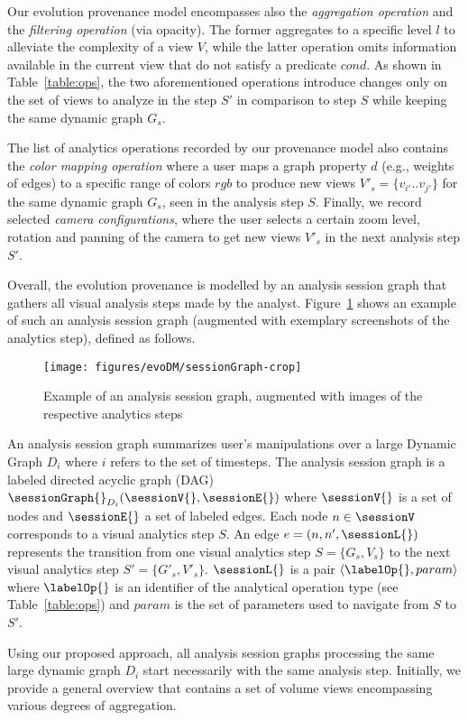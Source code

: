Our evolution provenance model encompasses also the \emph{aggregation operation} and the \emph{filtering operation} (via opacity). 
The former aggregates to a specific level $l$ to alleviate the complexity of a view $V$, while the latter operation omits information available in the current view that do not satisfy a predicate $cond$. As shown in Table~\ref{table:ops}, the two aforementioned operations introduce changes only on the set of views to analyze in the step $S'$ in comparison to step $S$ while keeping the same dynamic graph $G_s$.

The list of analytics operations recorded by our provenance model also contains the \emph{color mapping operation} where a user maps a graph property $d$ (e.g., weights of edges) to a specific range of colors $rgb$ to produce new views $V'_{s}=\{v_{i'}..v_{j'}\}$ for the same dynamic graph $G_s$, seen in the analysis step $S$. 
Finally, we record selected \emph{camera configurations}, where the user selects a certain zoom level, rotation and panning of the camera to get new views $V'_s$ in the next analysis step $S'$.




Overall, the evolution provenance is modelled by an analysis session graph that gathers all visual analysis steps made by the analyst. 
Figure~\ref{fig:expo-session} shows an example of such an analysis session graph (augmented with exemplary screenshots of the analytics step), defined as follows.

\begin{figure}[t]
	\begin{center}
	\texttt{[image: figures/evoDM/sessionGraph-crop]}
			\end{center}
			\caption{Example of an analysis session graph, augmented with images of the respective analytics steps~\cite{Bruder2019}}
			\label{fig:expo-session}
\end{figure}

\begin{definition}
An analysis session graph summarizes user's manipulations over a large Dynamic Graph $D_i$ where $i$ refers to the set of timesteps.
The analysis session graph is a labeled directed acyclic graph (DAG) $\sessionGraph{}_{D_i}(\sessionV{}, \sessionE{})$ where $\sessionV{}$ is a set of nodes and $\sessionE{}$ a set of labeled edges. 
Each node $n \in \sessionV$ corresponds to a visual analytics step $S$.
An edge $e = (n, n', \sessionL{})$ represents the transition from one visual analytics step $S = \{{G_s}, V_s\}$ to the next visual analytics step $S' = \{{G'_s}, V'_s\}$. $\sessionL{}$ is a pair $\langle \labelOp{}, param \rangle$ where $\labelOp{}$ is an identifier of the analytical operation type (see Table~\ref{table:ops}) and $param$ is the set of parameters used to navigate from $S$ to $S'$.
\label{def:sessionA02}
\end{definition}





Using our proposed approach, all analysis session graphs processing the same large dynamic graph $D_i$ start necessarily with the same analysis step. 
Initially, we provide a general overview that contains a set of volume views encompassing various degrees of aggregation.

